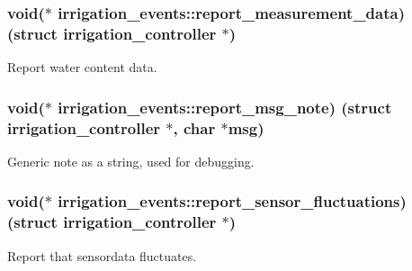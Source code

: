 \subsubsection[{report\+\_\+measurement\+\_\+data}]{\setlength{\rightskip}{0pt plus 5cm}void($\ast$ irrigation\+\_\+events\+::report\+\_\+measurement\+\_\+data) (struct {\bf irrigation\+\_\+controller} $\ast$)}\label{structirrigation__events_add396df12f986fff177801aa022c35f2}


Report water content data. 

\hypertarget{structirrigation__events_aae13c04da50716a2433bebd672d129e2}{}
\subsubsection[{report\+\_\+msg\+\_\+note}]{\setlength{\rightskip}{0pt plus 5cm}void($\ast$ irrigation\+\_\+events\+::report\+\_\+msg\+\_\+note) (struct {\bf irrigation\+\_\+controller} $\ast$, char $\ast$msg)}\label{structirrigation__events_aae13c04da50716a2433bebd672d129e2}


Generic note as a string, used for debugging. 

\hypertarget{structirrigation__events_a41db6d6a624689abdb7be82425ff0b02}{}
\subsubsection[{report\+\_\+sensor\+\_\+fluctuations}]{\setlength{\rightskip}{0pt plus 5cm}void($\ast$ irrigation\+\_\+events\+::report\+\_\+sensor\+\_\+fluctuations) (struct {\bf irrigation\+\_\+controller} $\ast$)}\label{structirrigation__events_a41db6d6a624689abdb7be82425ff0b02}


Report that sensordata fluctuates. 

\hypertarget{structirrigation__events_abafd6872889e6e54648653f690e61ec6}{}
